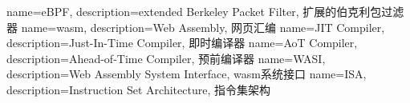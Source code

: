  {
    name={eBPF},
    description={extended Berkeley Packet Filter, 扩展的伯克利包过滤器}
}
 {
    name={wasm},
    description={Web Assembly, 网页汇编}
}
 {
    name={JIT Compiler},
    description={Just-In-Time Compiler, 即时编译器}
}
 {
    name={AoT Compiler},
    description={Ahead-of-Time Compiler, 预前编译器}
}
 {
    name={WASI},
    description={Web Assembly System Interface, wasm系统接口}
}
 {
	name={ISA}, 
	description={Instruction Set Architecture, 指令集架构}
}
